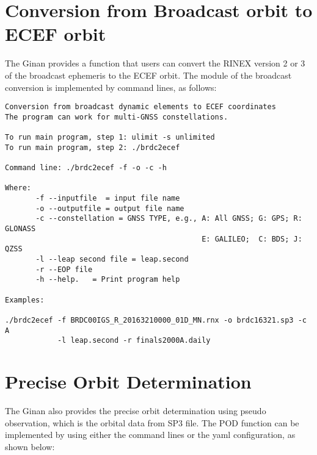 \section{Conversion from Broadcast orbit to ECEF orbit}
The Ginan provides a function that users can convert the RINEX version 2 or 3 of the broadcast ephemeris to the ECEF orbit. The module of the broadcast conversion is implemented by command lines, as follows:
\begin{verbatim}
Conversion from broadcast dynamic elements to ECEF coordinates
The program can work for multi-GNSS constellations.

To run main program, step 1: ulimit -s unlimited
To run main program, step 2: ./brdc2ecef

Command line: ./brdc2ecef -f -o -c -h

Where:
       -f --inputfile  = input file name
       -o --outputfile = output file name
       -c --constellation = GNSS TYPE, e.g., A: All GNSS; G: GPS; R: GLONASS
                                             E: GALILEO;  C: BDS; J: QZSS
       -l --leap second file = leap.second
       -r --EOP file
       -h --help.   = Print program help

Examples:

./brdc2ecef -f BRDC00IGS_R_20163210000_01D_MN.rnx -o brdc16321.sp3 -c A 
            -l leap.second -r finals2000A.daily
\end{verbatim}

\section{Precise Orbit Determination}
The Ginan also provides the precise orbit determination using pseudo observation, which is the orbital data from SP3 file. The POD function can be implemented by using either the command lines or the yaml configuration, as shown below:

